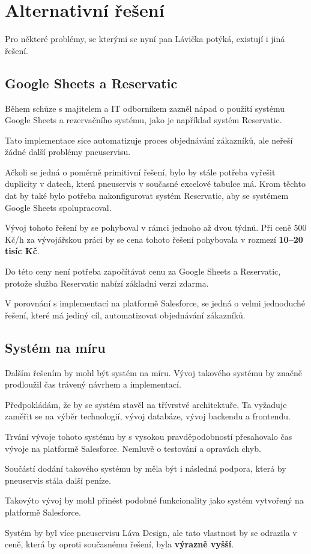 \section{Alternativní řešení}
Pro některé problémy, se kterými se nyní pan Lávička potýká, existují i jiná řešení.
\subsection{Google Sheets a Reservatic}
Během schůze s majitelem a IT odborníkem zazněl nápad o použití systému Google Sheets a rezervačního systému, jako je například systém Reservatic.

Tato implementace sice automatizuje proces objednávání zákazníků, ale neřeší žádné další problémy pneuservisu.

Ačkoli se jedná o poměrně primitivní řešení, bylo by stále potřeba vyřešit duplicity v datech, která pneuservis v současné excelové tabulce má. Krom těchto dat by také bylo potřeba nakonfigurovat systém Reservatic, aby se systémem Google Sheets spolupracoval. 

Vývoj tohoto řešení by se pohyboval v rámci jednoho až dvou týdnů. Při ceně 500 Kč/h za vývojářskou práci by se cena tohoto řešení pohybovala v rozmezí \textbf{10--20 tisíc Kč}.

Do této ceny není potřeba započítávat cenu za Google Sheets a Reservatic, protože služba Reservatic nabízí základní verzi zdarma. \cite{ReservaticPricing}

V porovnání s implementací na platformě Salesforce, se jedná o velmi jednoduché řešení, které má jediný cíl, automatizovat objednávání zákazníků.
\subsection{Systém na míru}
Dalším řešením by mohl být systém na míru. Vývoj takového systému  by značně prodloužil čas trávený návrhem a implementací.

Předpokládám, že by se systém stavěl na třívrstvé architektuře. Ta vyžaduje zaměřit se na výběr technologií, vývoj databáze, vývoj backendu a frontendu.

Trvání vývoje tohoto systému by s vysokou pravděpodobností přesahovalo čas vývoje na platformě Salesforce. Nemluvě o testování a opravách chyb.

Součástí dodání takového systému by měla být i následná podpora, která by pneuservis stála další peníze.

Takovýto vývoj by mohl přinést podobné funkcionality jako systém vytvořený na platformě Salesforce. 

Systém by byl více  pneuservisu Láva Design, ale tato vlastnost by se odrazila v ceně, která by oproti současnému řešení, byla \textbf{výrazně vyšší}.

